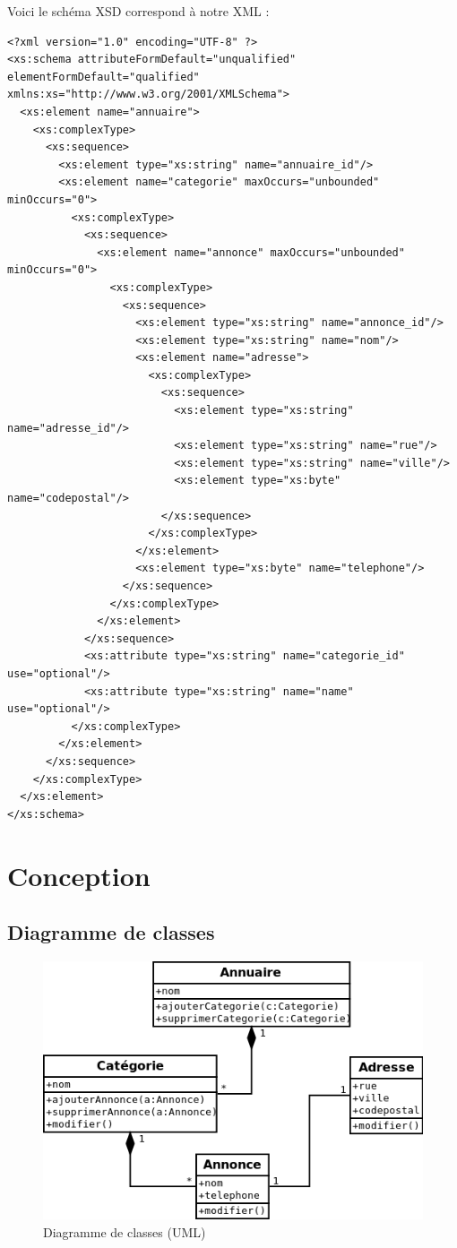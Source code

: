 Voici le schéma XSD correspond à notre XML :

\begin{lstlisting}
<?xml version="1.0" encoding="UTF-8" ?>
<xs:schema attributeFormDefault="unqualified" elementFormDefault="qualified" xmlns:xs="http://www.w3.org/2001/XMLSchema">
  <xs:element name="annuaire">
    <xs:complexType>
      <xs:sequence>
        <xs:element type="xs:string" name="annuaire_id"/>
        <xs:element name="categorie" maxOccurs="unbounded" minOccurs="0">
          <xs:complexType>
            <xs:sequence>
              <xs:element name="annonce" maxOccurs="unbounded" minOccurs="0">
                <xs:complexType>
                  <xs:sequence>
                    <xs:element type="xs:string" name="annonce_id"/>
                    <xs:element type="xs:string" name="nom"/>
                    <xs:element name="adresse">
                      <xs:complexType>
                        <xs:sequence>
                          <xs:element type="xs:string" name="adresse_id"/>
                          <xs:element type="xs:string" name="rue"/>
                          <xs:element type="xs:string" name="ville"/>
                          <xs:element type="xs:byte" name="codepostal"/>
                        </xs:sequence>
                      </xs:complexType>
                    </xs:element>
                    <xs:element type="xs:byte" name="telephone"/>
                  </xs:sequence>
                </xs:complexType>
              </xs:element>
            </xs:sequence>
            <xs:attribute type="xs:string" name="categorie_id" use="optional"/>
            <xs:attribute type="xs:string" name="name" use="optional"/>
          </xs:complexType>
        </xs:element>
      </xs:sequence>
    </xs:complexType>
  </xs:element>
</xs:schema>
\end{lstlisting}

\chapter{Conception}
\section{Diagramme de classes}

\begin{figure}[H]
    \centering\includegraphics[width=.8\textwidth]{images/UML.png}
    \caption{Diagramme de classes (UML)}
\end{figure}

